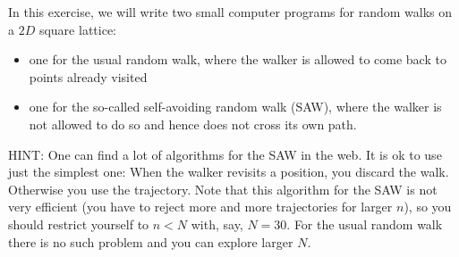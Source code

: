 In this exercise, we will write two small computer programs for random
walks on a $2D$ square lattice:
\begin{itemize}
    \item one for the usual random walk, where the walker is allowed to 
        come back to points already visited
    \item one for the so-called self-avoiding random walk (SAW), 
        where the walker is not allowed to do so and hence does not 
        cross its own path.
\end{itemize}
HINT: One can find a lot of algorithms for the SAW in the web. It is ok 
to use just the simplest one: When the walker revisits a position, you 
discard the walk. Otherwise you use the trajectory. Note that this 
algorithm for the SAW is not very efficient (you have to reject more 
and more trajectories for larger $n$), so you should restrict yourself 
to $n<N$ with, say, $N=30$. For the usual random walk there is no such 
problem and you can explore larger $N$.


